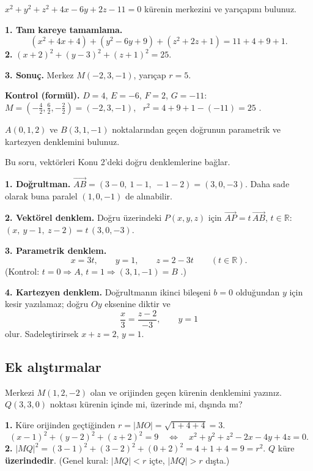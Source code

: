 \begin{soru}
$x^2+y^2+z^2+4x-6y+2z-11=0$ kürenin merkezini ve yarıçapını bulunuz.
\end{soru}
\begin{cevap}
\textbf{1. Tam kareye tamamlama.}
\[
(x^2+4x+4)+(y^2-6y+9)+(z^2+2z+1)=11+4+9+1 .
\]
\textbf{2.} $(x+2)^2+(y-3)^2+(z+1)^2=25$.

\textbf{3. Sonuç.} Merkez $M(-2,3,-1)$, yarıçap $r=5$.

\textbf{Kontrol (formül).} $D=4$, $E=-6$, $F=2$, $G=-11$: $M=\left(-\frac42,\frac62,-\frac22\right)=(-2,3,-1)$, \ $r^2=4+9+1-(-11)=25$ \checkmark.
\end{cevap}

\begin{soru}
$A(0,1,2)$ ve $B(3,1,-1)$ noktalarından geçen doğrunun parametrik ve kartezyen denklemini bulunuz.
\end{soru}
\begin{cevap}
Bu soru, vektörleri Konu 2'deki doğru denklemlerine bağlar.

\textbf{1. Doğrultman.} $\overrightarrow{AB}=(3-0,\ 1-1,\ -1-2)=(3,0,-3)$. Daha sade olarak buna paralel $(1,0,-1)$ de alınabilir.

\textbf{2. Vektörel denklem.} Doğru üzerindeki $P(x,y,z)$ için $\overrightarrow{AP}=t\,\overrightarrow{AB}$, $t\in\mathbb R$:
$(x,\ y-1,\ z-2)=t\,(3,0,-3)$.

\textbf{3. Parametrik denklem.}
\[
x=3t,\qquad y=1,\qquad z=2-3t\qquad(t\in\mathbb R).
\]
(Kontrol: $t=0\Rightarrow A$, $t=1\Rightarrow(3,1,-1)=B$ \checkmark.)

\textbf{4. Kartezyen denklem.} Doğrultmanın ikinci bileşeni $b=0$ olduğundan $y$ için kesir yazılamaz; doğru $Oy$ eksenine diktir ve
\[
\frac{x}{3}=\frac{z-2}{-3},\qquad y=1
\]
olur. Sadeleştirirsek $x+z=2$, $y=1$.
\end{cevap}

\subsection{Ek alıştırmalar}

\begin{soru}
Merkezi $M(1,2,-2)$ olan ve orijinden geçen kürenin denklemini yazınız. $Q(3,3,0)$ noktası kürenin içinde mi, üzerinde mi, dışında mı?
\end{soru}
\begin{cevap}
\textbf{1.} Küre orijinden geçtiğinden $r=|MO|=\sqrt{1+4+4}=3$.
\[
(x-1)^2+(y-2)^2+(z+2)^2=9\quad\Longleftrightarrow\quad x^2+y^2+z^2-2x-4y+4z=0 .
\]
\textbf{2.} $|MQ|^2=(3-1)^2+(3-2)^2+(0+2)^2=4+1+4=9=r^2$. $Q$ küre \textbf{üzerindedir}. (Genel kural: $|MQ|<r$ içte, $|MQ|>r$ dışta.)
\end{cevap}


